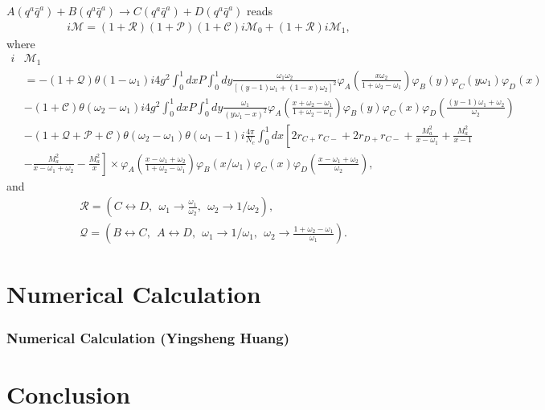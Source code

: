 \documentclass[8pt]{beamer}
\begin{document}
\begin{frame}
	$A(q^a \bar
		q^a)+B(q^a\bar q^a)\rightarrow C(q^a\bar q^a)+D(q^a\bar q^a) $ reads
	\begin{eqnarray}
		i\mathcal{M}
		=(1+\mathcal{R})(1+\mathcal{P})(1+\mathcal{C})i\mathcal{M}_{0}+(1+\mathcal{R})i\mathcal{M}_{1},
	\end{eqnarray}
    where
    \small
	\begin{align*}
        i&\mathcal{M}_{1}\\
        &=-(1+\mathcal{Q})\theta(1-\omega_1)i4g^2\int_0^1
		dx P\int_0^1
		dy\frac{\omega_1\omega_2}{[(y-1)\omega_1+(1-x)\omega_2]^2}\varphi_A(\frac{x\omega_2}{1+\omega_2-\omega_1})\varphi_B(y)
		\varphi_C(y\omega_1)\varphi_D(x)\nonumber\\
		&-(1+\mathcal{C})\theta(\omega_2-\omega_1)i4g^2\int_0^1dx P\int_0^1
		dy\frac{\omega_1}{(y\omega_1-x)^2}\varphi_A(\frac{x+\omega_2-\omega_1}{1+\omega_2-\omega_1})\varphi_B(y)
		\varphi_C(x)\varphi_D(\frac{(y-1)\omega_1+\omega_2}{\omega_2})\nonumber\\
		&
		-(1+\mathcal{Q}+\mathcal{P}+\mathcal{C})\theta(\omega_2-\omega_1)\theta(\omega_1-1)i\frac{4\pi}{N_c}\int_0^1
		dx\left[2r_{C+}r_{C-}+2r_{D+}r_{C-}+\frac{M_a^2}{x-\omega_1}+\frac{M_a^2}{x-1}\right.\nonumber\\
		&\left.-\frac{M_a^2}{x-\omega_1+\omega_2} -\frac{M_a^2}{x}\right]
		\times\varphi_A(\frac{x-\omega_1+\omega_2}{1+\omega_2-\omega_1})\varphi_B(x/\omega_1)
		\varphi_C(x)\varphi_D(\frac{x-\omega_1+\omega_2}{\omega_2}),\nonumber
    \end{align*}
    \normalsize
	and
	\begin{align}
		&\mathcal{R}=(C\leftrightarrow D,\ \ \omega_1\rightarrow
		\frac{\omega_1}{\omega_2},\ \ \omega_2\rightarrow 1/\omega_2),\ \ \ \nonumber\\
		&\mathcal{Q}=(B\leftrightarrow C,\ \ A\leftrightarrow D,\ \
		\omega_1\rightarrow 1/\omega_1,\ \ \omega_2\rightarrow
		\frac{1+\omega_2-\omega_1}{\omega_1}).
	\end{align}
\end{frame}

\section{Numerical Calculation}
\begin{frame}
    \frametitle{Numerical Calculation (Yingsheng Huang)}
\end{frame}

\section{Conclusion}
\begin{frame}
    \frametitle{\insertsectionhead}
\end{frame}
\end{document}
